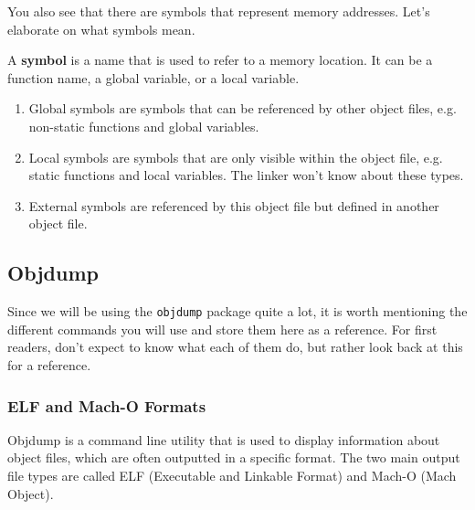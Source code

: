 \documentclass{article}
\begin{document}
    \begin{example}
      
    \end{example}

    You also see that there are symbols that represent memory addresses. Let's elaborate on what symbols mean. 

    \begin{definition}[Symbol]
      A \textbf{symbol} is a name that is used to refer to a memory location. It can be a function name, a global variable, or a local variable. 
      \begin{enumerate}
        \item Global symbols are symbols that can be referenced by other object files, e.g. non-static functions and global variables. 
        \item Local symbols are symbols that are only visible within the object file, e.g. static functions and local variables. The linker won't know about these types. 
        \item External symbols are referenced by this object file but defined in another object file. 
      \end{enumerate}
    \end{definition}

  \subsection{Objdump} 

    Since we will be using the \texttt{objdump} package quite a lot, it is worth mentioning the different commands you will use and store them here as a reference. For first readers, don't expect to know what each of them do, but rather look back at this for a reference. 

    \subsubsection{ELF and Mach-O Formats}

      Objdump is a command line utility that is used to display information about object files, which are often outputted in a specific format. The two main output file types are called ELF (Executable and Linkable Format) and Mach-O (Mach Object). 
\end{document}
